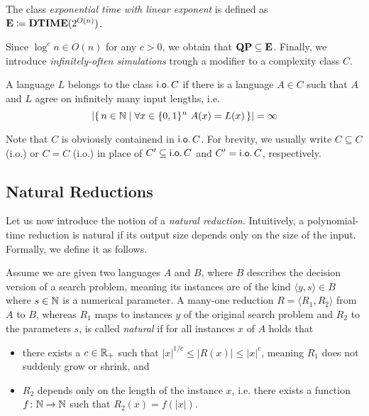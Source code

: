 \documentclass[11pt]{article}
\begin{document}
\begin{definition}
  The class \emph{exponential time with linear exponent} is defined as
	$\mathbf{E} \coloneqq \mathbf{DTIME}(2^{O(n)})$.
\end{definition}
Since $\log^c n \in O(n)$ for any $c > 0$, we obtain that
$\mathbf{QP} \subseteq \mathbf{E}$.
%
Finally, we introduce \emph{infinitely-often simulations} trough a modifier to
a complexity class $C$.
\begin{definition}
  A language $L$ belongs to the class
  $\mathsf{i.o.}\, C$ if there is a language $A \in C$ such that
  $A$ and $L$ agree on infinitely many input lengths, i.e.
  \[
    |\set{ n \in \N \mid \forall x \in \{0,1\}^n\ A(x) = L(x) }| = \infty
  \]
\end{definition}
Note that $C$ is obviously containend in $\mathsf{i.o.}\, C$.
For brevity, we usually write $C \subseteq C$ (i.o.) or $C = C$ (i.o.)
in place of $C' \subseteq \mathsf{i.o.}\, C$ and $C' = \mathsf{i.o.}\, C$, respectively.



\subsection{Natural Reductions}

Let us now introduce the notion of a \textit{natural reduction}.
Intuitively, a polynomial-time reduction is natural if its output size
depends only on the size of the input. Formally, we define it as follows.

\begin{definition}
  Assume we are given two languages $A$ and $B$, where $B$ describes the
  decision version of a search problem, meaning its instances are of the kind
  $\langle y, s \rangle \in B$ where $s \in {\mathbb{N}}$ is a numerical parameter.
  A many-one reduction $R = \langle R_1, R_2 \rangle$ from $A$ to $B$, whereas
  $R_1$ maps to instances $y$ of the original search problem and $R_2$ to the
  parameters $s$, is called \emph{natural} if for all instances $x$ of $A$ holds
  that
  \begin{itemize}
    \item there exists a $c \in {\mathbb R}_+$ such that
      $|x|^{1/c} \le |R(x)| \le |x|^c$, meaning $R_1$ does not suddenly grow or
      shrink, and
    \item $R_2$ depends only on the length of the instance $x$, i.e. there
      exists a function $f \colon {\mathbb{N}} \to {\mathbb{N}}$ such that $R_2(x) = f(|x|)$.
  \end{itemize}
\end{definition}
	
\end{document}
